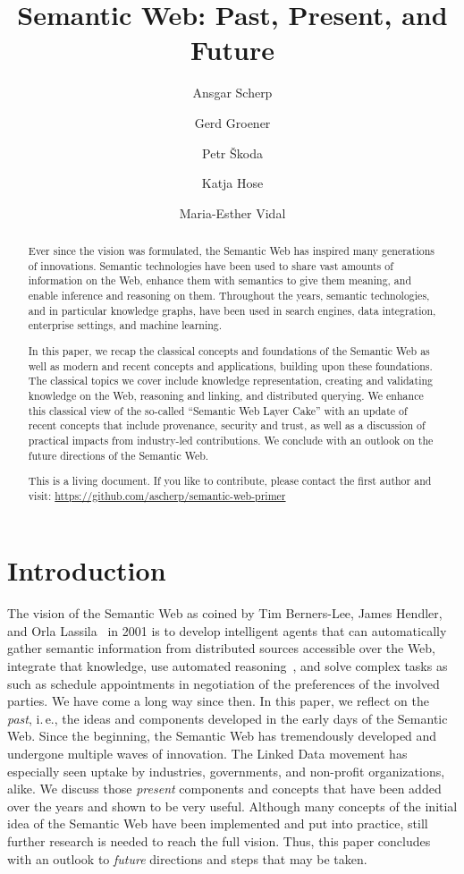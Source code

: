\documentclass[a4paper,USenglish]{tgdk-v2021}
\author{Ansgar Scherp}{Ulm University, Germany \and \url{http://ansgarscherp.net}}{ansgar.scherp@uni-ulm.de}{https://orcid.org/0000-0002-2653-9245}{}
\author{Gerd Groener}{Carl Zeiss SMT GmbH, Germany \and
\url{http://www.gerd-groener.de}}{gerd.groener@gmx.de}{https://orcid.org/0009-0002-0259-9769}{}{}
\author{Petr \v{S}koda}{Department of Software Engineering, Faculty of Mathematics and Physics, Charles University, Prague, Czechia}{petr.skoda@matfyz.cuni.cz}{https://orcid.org/0000-0002-2732-9370}{}
\author{Katja Hose}{TU Wien, Austria \and \url{http://www.katja-hose.de}}{katja.hose@tuwien.ac.at} {https://orcid.org/0000-0001-7025-8099}{}
\author{Maria-Esther Vidal}{Leibniz University of Hannover and TIB-Leibniz Information Centre for Science and Technology, Germany}{maria.vidal@tib.eu}{https://orcid.org/0000-0003-1160-8727}{Partially funded by Leibniz Association, program "Leibniz Best Minds: Programme for Women Professors", project TrustKG-Transforming Data in Trustable Insights; Grant P99/2020}
\newcommand{\arxivonly}[1]{}
\begin{document}
\title{Semantic Web: Past, Present, and Future}
\maketitle

\begin{abstract}

Ever since the vision was formulated, the Semantic Web has inspired many generations of innovations.
Semantic technologies have been used to share vast amounts of information on the Web, enhance them with semantics to give them meaning, and enable inference and reasoning on them. 
Throughout the years, semantic technologies, and in particular knowledge graphs, have been used in search engines, data integration, enterprise settings, and machine learning.

In this paper, we recap the classical concepts and foundations of the Semantic Web as well as modern and recent concepts and applications, building upon these foundations. 
The classical topics we cover include knowledge representation, creating and validating knowledge on the Web, reasoning and linking, and distributed querying.
We enhance this classical view of the so-called ``Semantic Web Layer Cake'' with an update of recent concepts that include provenance, security and trust, as well as a discussion of practical impacts from industry-led contributions.
We conclude with an outlook on the future directions of the Semantic Web.

This is a living document. 
If you like to contribute, please contact the first author and visit: \url{https://github.com/ascherp/semantic-web-primer}
\end{abstract}

\arxivonly{\tableofcontents}

\section{Introduction}

The vision of the Semantic Web as coined by Tim Berners-Lee, James Hendler, and Orla Lassila~\cite{TimBernersLee2001} in 2001 is to develop intelligent agents that can automatically gather semantic information from distributed sources accessible over the Web, integrate that knowledge, use automated reasoning~\cite{DBLP:journals/ki/GlimmS16a}, and solve complex tasks as such as schedule appointments in negotiation of the preferences of the involved parties.
We have come a long way since then.
In this paper, we reflect on the \textit{past}, i.\,e., the ideas and components developed in the early days of the Semantic Web.
Since the beginning, the Semantic Web has tremendously developed and undergone multiple waves of innovation.
The Linked Data movement has especially seen uptake by industries, governments, and non-profit organizations, alike.
We discuss those \textit{present} components and concepts that have been added over the years and shown to be very useful.
Although many concepts of the initial idea of the Semantic Web have been implemented and put into practice, still further research is needed to reach the full vision.
Thus, this paper concludes with an outlook to \textit{future} directions and steps that may be taken.
\end{document}
